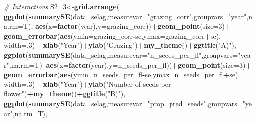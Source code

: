 \documentclass[
]{article}
\newenvironment{Shaded}{\begin{snugshade}}{\end{snugshade}}
\newcommand{\CommentTok}[1]{\textcolor[rgb]{0.56,0.35,0.01}{\textit{#1}}}
\newcommand{\DataTypeTok}[1]{\textcolor[rgb]{0.13,0.29,0.53}{#1}}
\newcommand{\DecValTok}[1]{\textcolor[rgb]{0.00,0.00,0.81}{#1}}
\newcommand{\KeywordTok}[1]{\textcolor[rgb]{0.13,0.29,0.53}{\textbf{#1}}}
\newcommand{\NormalTok}[1]{#1}
\newcommand{\OperatorTok}[1]{\textcolor[rgb]{0.81,0.36,0.00}{\textbf{#1}}}
\newcommand{\StringTok}[1]{\textcolor[rgb]{0.31,0.60,0.02}{#1}}
\begin{document}
\begin{Shaded}
\begin{Highlighting}[]
\CommentTok{# Interactions}
\NormalTok{S2_}\DecValTok{3}\NormalTok{<-}\KeywordTok{grid.arrange}\NormalTok{(}
  \KeywordTok{ggplot}\NormalTok{(}\KeywordTok{summarySE}\NormalTok{(data_selag,}\DataTypeTok{measurevar=}\StringTok{"grazing_corr"}\NormalTok{,}\DataTypeTok{groupvars=}\StringTok{"year"}\NormalTok{,}\DataTypeTok{na.rm=}\NormalTok{T),}
         \KeywordTok{aes}\NormalTok{(}\DataTypeTok{x=}\KeywordTok{factor}\NormalTok{(year),}\DataTypeTok{y=}\NormalTok{grazing_corr))}\OperatorTok{+}\KeywordTok{geom_point}\NormalTok{(}\DataTypeTok{size=}\DecValTok{3}\NormalTok{)}\OperatorTok{+}
\StringTok{    }\KeywordTok{geom_errorbar}\NormalTok{(}\KeywordTok{aes}\NormalTok{(}\DataTypeTok{ymin=}\NormalTok{grazing_corr}\OperatorTok{-}\NormalTok{se,}\DataTypeTok{ymax=}\NormalTok{grazing_corr}\OperatorTok{+}\NormalTok{se), }\DataTypeTok{width=}\NormalTok{.}\DecValTok{3}\NormalTok{)}\OperatorTok{+}
\StringTok{    }\KeywordTok{xlab}\NormalTok{(}\StringTok{"Year"}\NormalTok{)}\OperatorTok{+}\KeywordTok{ylab}\NormalTok{(}\StringTok{"Grazing"}\NormalTok{)}\OperatorTok{+}\KeywordTok{my_theme}\NormalTok{()}\OperatorTok{+}\KeywordTok{ggtitle}\NormalTok{(}\StringTok{"A)"}\NormalTok{),}
  \KeywordTok{ggplot}\NormalTok{(}\KeywordTok{summarySE}\NormalTok{(data_selag,}\DataTypeTok{measurevar=}\StringTok{"n_seeds_per_fl"}\NormalTok{,}\DataTypeTok{groupvars=}\StringTok{"year"}\NormalTok{,}\DataTypeTok{na.rm=}\NormalTok{T),}
         \KeywordTok{aes}\NormalTok{(}\DataTypeTok{x=}\KeywordTok{factor}\NormalTok{(year),}\DataTypeTok{y=}\NormalTok{n_seeds_per_fl))}\OperatorTok{+}\KeywordTok{geom_point}\NormalTok{(}\DataTypeTok{size=}\DecValTok{3}\NormalTok{)}\OperatorTok{+}
\StringTok{    }\KeywordTok{geom_errorbar}\NormalTok{(}\KeywordTok{aes}\NormalTok{(}\DataTypeTok{ymin=}\NormalTok{n_seeds_per_fl}\OperatorTok{-}\NormalTok{se,}\DataTypeTok{ymax=}\NormalTok{n_seeds_per_fl}\OperatorTok{+}\NormalTok{se), }\DataTypeTok{width=}\NormalTok{.}\DecValTok{3}\NormalTok{)}\OperatorTok{+}
\StringTok{    }\KeywordTok{xlab}\NormalTok{(}\StringTok{"Year"}\NormalTok{)}\OperatorTok{+}\KeywordTok{ylab}\NormalTok{(}\StringTok{"Number of seeds per flower"}\NormalTok{)}\OperatorTok{+}\KeywordTok{my_theme}\NormalTok{()}\OperatorTok{+}\KeywordTok{ggtitle}\NormalTok{(}\StringTok{"B)"}\NormalTok{),}
  \KeywordTok{ggplot}\NormalTok{(}\KeywordTok{summarySE}\NormalTok{(data_selag,}\DataTypeTok{measurevar=}\StringTok{"prop_pred_seeds"}\NormalTok{,}\DataTypeTok{groupvars=}\StringTok{"year"}\NormalTok{,}\DataTypeTok{na.rm=}\NormalTok{T),}

\end{Highlighting}
\end{Shaded}
\end{document}
